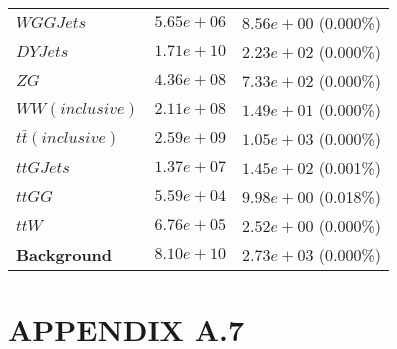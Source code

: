 \begin{table}
\begin{tabular}{ |l|c|c| }
                                 $WGGJets$ &  $5.65e+06$  &  $8.56e+00$ (0.000\%) \\
                                  $DYJets$ &  $1.71e+10$  &  $2.23e+02$ (0.000\%) \\
                                      $ZG$ &  $4.36e+08$  &  $7.33e+02$ (0.000\%) \\
                           $WW(inclusive)$ &  $2.11e+08$  &  $1.49e+01$ (0.000\%) \\
                    $t\bar{t} (inclusive)$ &  $2.59e+09$  &  $1.05e+03$ (0.000\%) \\
                                 $ttGJets$ &  $1.37e+07$  &  $1.45e+02$ (0.001\%) \\
                                    $ttGG$ &  $5.59e+04$  &  $9.98e+00$ (0.018\%) \\
                                     $ttW$ &  $6.76e+05$  &  $2.52e+00$ (0.000\%) \\
                       \textbf{Background} &  $8.10e+10$  &  $2.73e+03$ (0.000\%) \\
    \hline
    \end{tabular}
    \label{cutflow-doubletau}
\end{table}
\newpage


\section*{APPENDIX A.7}

